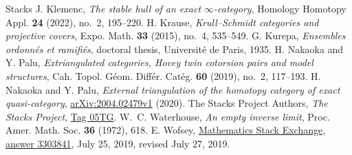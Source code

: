 \documentclass[a4paper,reqno,10pt]{amsart}
\numberwithin{equation}{section}
\theoremstyle{definition}
\begin{document}
\begin{thebibliography}{Stacks}
J. Klemenc, \emph{The stable hull of an exact $\infty$-category},
Homology Homotopy Appl. \textbf{24} (2022), no.~2, 195--220.
H. Krause, \emph{Krull--Schmidt categories and projective covers},
Expo. Math. \textbf{33} (2015), no.~4, 535--549.
G. Kurepa, \emph{Ensembles ordonn\'es et ramifi\'es},
doctoral thesis, Universit\'e de Paris, 1935.
H. Nakaoka and Y. Palu, \emph{Extriangulated categories, Hovey twin cotorsion
pairs and model structures}, Cah. Topol. G\'eom. Diff\'er. Cat\'eg.
\textbf{60} (2019), no.~2, 117--193.
H. Nakaoka and Y. Palu, \emph{External triangulation of the homotopy
category of exact quasi-category},
\href{https://arxiv.org/abs/2004.02479v1}{arXiv:2004.02479v1} (2020).
The Stacks Project Authors, \emph{The Stacks Project},
\href{https://stacks.math.columbia.edu/tag/05TG}{Tag 05TG}.
W.~C. Waterhouse, \emph{An empty inverse limit},
Proc. Amer. Math. Soc. \textbf{36} (1972), 618.
E. Wofsey, \href{https://math.stackexchange.com/a/3303841}{Mathematics
Stack Exchange, answer 3303841}, July 25, 2019, revised July 27, 2019.
\end{thebibliography}
\end{document}
